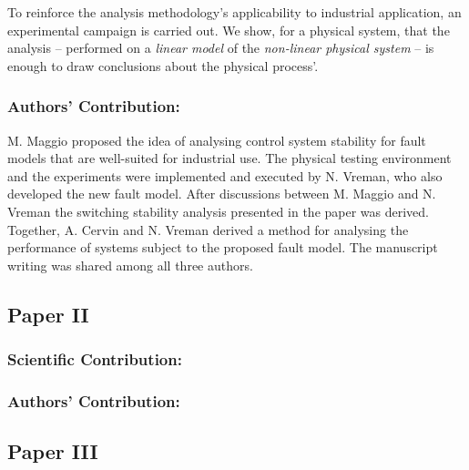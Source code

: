 To reinforce the analysis methodology's applicability to industrial application, an experimental campaign is carried out.
We show, for a physical system, that the analysis -- performed on a \emph{linear model} of the \emph{non-linear physical system} -- is enough to draw conclusions about the physical process'.

\subsubsection*{Authors' Contribution:}%
%
M. Maggio proposed the idea of analysing control system stability for fault models that are well-suited for industrial use.
The physical testing environment and the experiments were implemented and executed by N. Vreman, who also developed the new fault model.
After discussions between M. Maggio and N. Vreman the switching stability analysis presented in the paper was derived.
Together, A. Cervin and N. Vreman derived a method for analysing the performance of systems subject to the proposed fault model.
The manuscript writing was shared among all three authors.


\clearpage %

\subsection*{Paper II}%
%
\begin{quote}
\end{quote}

\subsubsection*{Scientific Contribution:}%
%

\subsubsection*{Authors' Contribution:}%
%


\clearpage %

\subsection*{Paper III}%
%
\begin{quote}
\end{quote}

